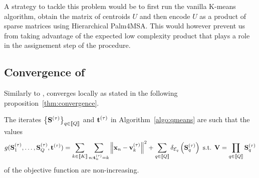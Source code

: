 


\begin{remark}
A strategy to tackle this problem would be to first run the vanilla K-means algorithm,
 obtain the matrix of centroids $U$ and then encode $U$ as a product of sparse matrices
 using Hierarchical Palm4MSA. This would however prevent us from taking advantage of 
 the expected low complexity product that plays a role in the assignement step of 
 the procedure.
\end{remark}


\subsection{Convergence of \qkmeans}
Similarly to \kmeans, \qkmeans converges locally as stated in the following proposition~\ref{thm:convergence}.

\begin{proposition}
\label{thm:convergence}
The iterates $\left \lbrace{\mathbf{S}}^{(\tau)} \right \rbrace_{q\in\left \llbracket Q\right \rrbracket}$ and ${\mathbf{t}}^{(\tau)}$ in Algorithm~\ref{algo:qmeans} are such that the values
\begin{align}
\label{eq:qmean_problem_2}
    g({\mathbf{S}}_1^{(\tau)}, \ldots,{\mathbf{S}}_Q^{(\tau)}, {\mathbf{t}}^{(\tau)})
    = \sum_{k\in\left \llbracket K\right \rrbracket} \sum_{n: {\mathbf{t}}^{(\tau)}_n = k} \left \| {\mathbf{x}}_n - {\mathbf{v}}^{(\tau)}_k\right \|^2 + \sum_{q\in\left \llbracket Q\right \rrbracket} \delta_{\mathcal{E}_q}\left ({\mathbf{S}}_q^{(\tau)}\right )
    \text{ s.t. } {\mathbf{V}} = \prod_{q\in\left \llbracket Q\right \rrbracket}{{\mathbf{S}}_q^{(\tau)}}
\end{align}
of the objective function are non-increasing.
\end{proposition}






